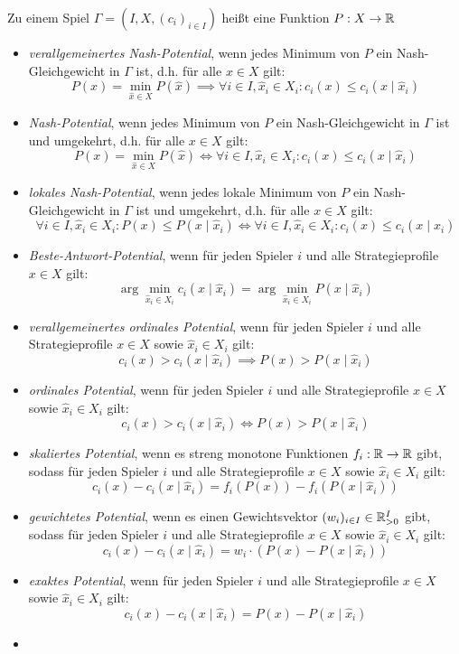 \begin{defn}
	Zu einem Spiel $\Gamma = (I, X, (c_i)_{i\in I})$ heißt eine Funktion $P: X \to \mathbb{R}$
	\begin{itemize}
		\item \emph{verallgemeinertes Nash-Potential}, wenn jedes Minimum von $P$ ein Nash-Gleichgewicht in $\Gamma$ ist, d.h. für alle $x \in X$ gilt:
			\[P(x) = \min_{\hat{x} \in X}P(\hat{x}) \implies \forall i \in I, \hat{x}_i \in X_i: c_i(x) \leq c_i(x \mid \hat{x}_i) \]
		\item \emph{Nash-Potential}, wenn jedes Minimum von $P$ ein Nash-Gleichgewicht in $\Gamma$ ist und umgekehrt, d.h. für alle $x \in X$ gilt:
			\[P(x) = \min_{\hat{x} \in X}P(\hat{x}) \iff \forall i \in I, \hat{x}_i \in X_i: c_i(x) \leq c_i(x \mid \hat{x}_i) \]
		\item \emph{lokales Nash-Potential}, wenn jedes lokale Minimum von $P$ ein Nash-Gleichgewicht in $\Gamma$ ist und umgekehrt, d.h. für alle $x \in X$ gilt:
			\[\forall i \in I, \hat{x}_i \in X_i: P(x) \leq P(x \mid \hat{x}_i) \iff \forall i \in I, \hat{x}_i \in X_i: c_i(x) \leq c_i(x \mid \hat{x}_i) \]
		\item \emph{Beste-Antwort-Potential}, wenn für jeden Spieler $i$ und alle Strategieprofile $x \in X$ gilt:
			\[\arg\min_{\hat{x}_i \in X_i}c_i(x \mid \hat{x}_i) = \arg \min_{\hat{x}_i \in X_i} P(x \mid \hat{x}_i)\]
		\item \emph{verallgemeinertes ordinales Potential}, wenn für jeden Spieler $i$ und alle Strategieprofile $x \in X$ sowie $\hat{x}_i \in X_i$ gilt:
			\[c_i(x) > c_i(x \mid \hat{x}_i) \implies P(x) > P(x \mid \hat{x}_i)\]
		\item \emph{ordinales Potential}, wenn für jeden Spieler $i$ und alle Strategieprofile $x \in X$ sowie $\hat{x}_i \in X_i$ gilt:
			\[c_i(x) > c_i(x \mid \hat{x}_i) \iff P(x) > P(x \mid \hat{x}_i)\]
		\item \emph{skaliertes Potential}, wenn es streng monotone Funktionen $f_i: \mathbb{R} \to \mathbb{R}$ gibt, sodass für jeden Spieler $i$ und alle Strategieprofile $x \in X$ sowie $\hat{x}_i \in X_i$ gilt:
			\[c_i(x) - c_i(x \mid \hat{x}_i) = f_i(P(x)) - f_i(P(x \mid \hat{x}_i))\]
		\item \emph{gewichtetes Potential}, wenn es einen Gewichtsvektor $(w_i)_{i\in I} \in \mathbb{R}_{>0}^I$ gibt, sodass für jeden Spieler $i$ und alle Strategieprofile $x \in X$ sowie $\hat{x}_i \in X_i$ gilt:
			\[c_i(x) - c_i(x \mid \hat{x}_i) = w_i\cdot(P(x) - P(x \mid \hat{x}_i))\]
		\item \emph{exaktes Potential}, wenn für jeden Spieler $i$ und alle Strategieprofile $x \in X$ sowie $\hat{x}_i \in X_i$ gilt:
			\[c_i(x) - c_i(x \mid \hat{x}_i) = P(x) - P(x \mid \hat{x}_i)\]
		\item {}
	\end{itemize}
\end{defn}

